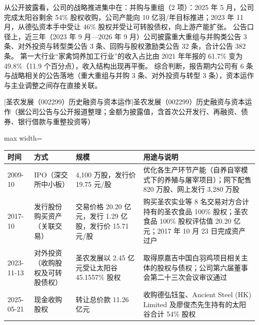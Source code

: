  从公开披露看，公司的战略推进集中在：并购与重组（2 项）：2025 年 5 月，公司完成太阳谷剩余 54\% 股权收购，公司产能向 10 亿羽/年目标推进；2023 年 11 月，从德弘资本手中受让 46\% 股权并受让可转股债权，向上游产能扩张。 公告口径上，近三年（2023 年 9 月---2026 年 9 月）公司披露重大重组与并购类公告 3 条、对外投资与转型类公告 3 条、回购与股权激励类公告 32 条，合计公告 382 条。 第一大行业“家禽饲养加工行业”的收入占比由 2021 年年报的 61.7\% 变为 49.8\%（11.9 个百分点），收入结构出现再平衡。 综合判断，报告期内公司有 6 条与战略相关的公告落地（重大重组与并购 3 条、对外投资与转型 3 条），资本运作与主业调整之间存在直接关联。

\begin{center}\small\setlength{\tabcolsep}{4pt}
[圣农发展（002299）历史融资与资本运作]{圣农发展（002299）历史融资与资本运作（据公司公告与公开报道整理；金额为披露值，含首次公开发行、再融资、债券、银行借款与重整投资等）}
\begin{adjustbox}{max width=\textwidth}
\begin{tabular}{@{}p{1.45cm}p{2.55cm}p{4.05cm}p{4.95cm}@{}}
\toprule
时间 & 方式 & 规模 & 用途与说明 \\
\midrule
2009-10 & IPO（深交所中小板） & 4,\allowbreak{}100 万股，\allowbreak{}发行价 19.75 元/\allowbreak{}股 & 优化各生产环节产能（自养自宰模式下的养殖与屠宰项目）；网下配售 820 万股、\allowbreak{}网上发行 3,\allowbreak{}280 万股 \\
2017-10 & 发行股份购买资产（关联交易） & 交易价格 20.20 亿元，\allowbreak{}发行 1.29 亿股，\allowbreak{}发行价 15.71 元/\allowbreak{}股 & 购买圣农实业等 8 名交易对方合计持有的圣农食品 100\% 股权；圣农食品 100\% 股权评估值 20.20 亿元；2017 年 10 月 23 日完成资产过户 \\
2023-11-13 & 对外投资（收购股权及可转股债权） & 圣农发展以 2.45 亿元受让太阳谷 45.1557\% 股权 & 取得原嘉吉中国白羽鸡项目相关主体的股权与债权；公司第六届董事会第二十三次会议审议通过 \\
2025-05-21 & 现金收购股权 & 转让总价款 11.26 亿元 & 收购德弘钰玺、\allowbreak{}Ancient Steel (HK) Limited 及廖俊杰先生持有的太阳谷合计 54\% 股权 \\
\bottomrule
\end{tabular}
\end{adjustbox}
\end{center}

